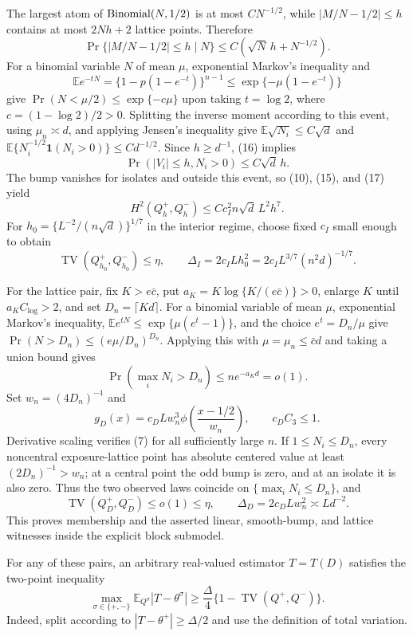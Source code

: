 The largest atom of \({\rm Binomial}(N,1/2)\) is at most \(CN^{-1/2}\), while \(|M/N-1/2|\leq h\) contains at most \(2Nh+2\) lattice points.  Therefore
\[
 \Pr\{|M/N-1/2|\leq h\mid N\}\leq C(\sqrt N\,h+N^{-1/2}).
\tag{16}
\]
For a binomial variable \(N\) of mean \(\mu\), exponential Markov's inequality and
\[
 \mathbb E e^{-tN}=\{1-p(1-e^{-t})\}^{n-1}
 \leq\exp\{-\mu(1-e^{-t})\}
\]
give \(\Pr(N<\mu/2)\leq\exp\{-c\mu\}\) upon taking \(t=\log2\), where \(c=(1-\log2)/2>0\).  Splitting the inverse moment according to this event, using \(\mu_n\asymp d\), and applying Jensen's inequality give \(\mathbb E\sqrt{N_i}\leq C\sqrt d\) and \(\mathbb E\{N_i^{-1/2}\mathbf1(N_i>0)\}\leq Cd^{-1/2}\).  Since \(h\geq d^{-1}\), (16) implies
\[
 \Pr(|V_i|\leq h,N_i>0)\leq C\sqrt d\,h.
\tag{17}
\]
The bump vanishes for isolates and outside this event, so (10), (15), and (17) yield
\[
 H^2(Q_h^+,Q_h^-)\leq Cc_I^2n\sqrt d\,L^2h^7.
\tag{18}
\]
For \(h_0=\{L^{-2}/(n\sqrt d)\}^{1/7}\) in the interior regime, choose fixed \(c_I\) small enough to obtain
\[
 \operatorname{TV}(Q_{h_0}^+,Q_{h_0}^-)\leq\eta,
 \qquad \Delta_I=2c_ILh_0^2
 =2c_IL^{3/7}(n^2d)^{-1/7}.
\tag{19}
\]

For the lattice pair, fix \(K>e\bar c\), put \(a_K=K\log\{K/(e\bar c)\}>0\), enlarge \(K\) until \(a_KC_{\log}>2\), and set \(D_n=\lceil Kd\rceil\).  For a binomial variable of mean \(\mu\), exponential Markov's inequality, \(\mathbb E e^{tN}\leq\exp\{\mu(e^t-1)\}\), and the choice \(e^t=D_n/\mu\) give \(\Pr(N>D_n)\leq(e\mu/D_n)^{D_n}\).  Applying this with \(\mu=\mu_n\leq\bar c d\) and taking a union bound gives
\[
 \Pr(\max_iN_i>D_n)\leq ne^{-a_Kd}=o(1).
\tag{20}
\]
Set \(w_n=(4D_n)^{-1}\) and
\[
 g_D(x)=c_DLw_n^3\phi\!\left(\frac{x-1/2}{w_n}\right),
 \qquad c_DC_3\leq1.
\tag{21}
\]
Derivative scaling verifies (7) for all sufficiently large \(n\).  If \(1\leq N_i\leq D_n\), every noncentral exposure-lattice point has absolute centered value at least \((2D_n)^{-1}>w_n\); at a central point the odd bump is zero, and at an isolate it is also zero.  Thus the two observed laws coincide on \(\{\max_iN_i\leq D_n\}\), and
\[
 \operatorname{TV}(Q_D^+,Q_D^-)\leq o(1)\leq\eta,
 \qquad \Delta_D=2c_DLw_n^2\asymp Ld^{-2}.
\tag{22}
\]
This proves membership and the asserted linear, smooth-bump, and lattice witnesses inside the explicit block submodel.

For any of these pairs, an arbitrary real-valued estimator \(T=T(D)\) satisfies the two-point inequality
\[
 \max_{\sigma\in\{+,-\}}\mathbb E_{Q^\sigma}|T-\theta^\sigma|
 \geq\frac\Delta4\{1-\operatorname{TV}(Q^+,Q^-)\}.
\tag{23}
\]
Indeed, split according to \(|T-\theta^+|\geq\Delta/2\) and use the definition of total variation.

